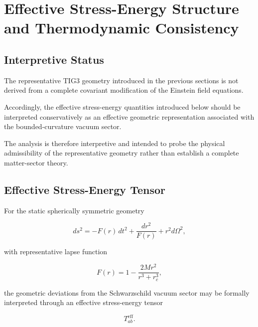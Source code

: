 
\section{Effective Stress-Energy Structure and Thermodynamic Consistency}

\subsection{Interpretive Status}

The representative TIG3 geometry introduced in the previous sections is not derived from a complete covariant modification of the Einstein field equations.

Accordingly, the effective stress-energy quantities introduced below should be interpreted conservatively as an effective geometric representation associated with the bounded-curvature vacuum sector.

The analysis is therefore interpretive and intended to probe the physical admissibility of the representative geometry rather than establish a complete matter-sector theory.


\subsection{Effective Stress-Energy Tensor}

For the static spherically symmetric geometry

\begin{equation}
ds^2
=
-F(r)\,dt^2
+
\frac{dr^2}{F(r)}
+
r^2 d\Omega^2,
\end{equation}

with representative lapse function

\begin{equation}
F(r)
=
1
-
\frac{2Mr^2}{r^3+r_c^3},
\end{equation}

the geometric deviations from the Schwarzschild vacuum sector may be formally interpreted through an effective stress-energy tensor

\begin{equation}
T^{\mathrm{eff}}_{ab}.
\end{equation}

